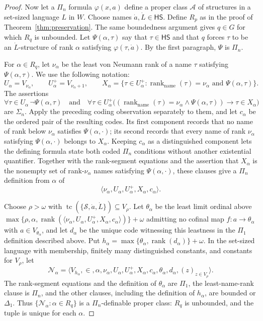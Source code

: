 \documentclass[11pt,a4paper]{amsart}
\newcommand{\HS}{\mathsf{HS}}
\newcommand{\tc}{\operatorname{tc}}
\newcommand{\rank}{\operatorname{rank}}
\newcommand{\namerank}{\operatorname{rank}_{\mathrm{name}}}
\theoremstyle{plain}
\theoremstyle{definition}
\theoremstyle{remark}
\begin{document}
\begin{proof}
Now let a $\Pi_n$ formula $\varphi(x,a)$ define a proper class $\mathcal A$ of structures in a set-sized language $L$ in $W$.  Choose names $\dot a,\dot L\in\HS$.  Define $R_p$ as in the proof of Theorem~\ref{thm:preservation}.  The same boundedness argument gives $q\in G$ for which $R_q$ is unbounded.  Let $\Psi(\alpha,\tau)$ say that $\tau\in\HS$ and that $q$ forces $\tau$ to be an $\dot L$-structure of rank $\alpha$ satisfying $\varphi(\tau,\dot a)$.  By the first paragraph, $\Psi$ is $\Pi_n$.

For $\alpha\in R_q$, let $\nu_\alpha$ be the least von Neumann rank of a name $\tau$ satisfying $\Psi(\alpha,\tau)$.  We use the following notation:
\[
U_\alpha=V_{\nu_\alpha},\qquad U_\alpha^+=V_{\nu_\alpha+1},\qquad
X_\alpha=\{\tau\in U_\alpha^+:\namerank(\tau)=\nu_\alpha\text{ and }\Psi(\alpha,\tau)\}.
\]
The assertions
\[
\forall\tau\in U_\alpha\,\neg\Psi(\alpha,\tau)
\quad\text{and}\quad
\forall\tau\in U_\alpha^+\bigl((\namerank(\tau)=\nu_\alpha\wedge\Psi(\alpha,\tau))\longrightarrow\tau\in X_\alpha\bigr)
\]
are $\Sigma_n$.  Apply the preceding coding observation separately to them, and let $c_\alpha$ be the ordered pair of the resulting codes.  Its first component records that no name of rank below $\nu_\alpha$ satisfies $\Psi(\alpha,\cdot)$; its second records that every name of rank $\nu_\alpha$ satisfying $\Psi(\alpha,\cdot)$ belongs to $X_\alpha$.  Keeping $c_\alpha$ as a distinguished component lets the defining formula state both coded $\Pi_n$ conditions without another existential quantifier.  Together with the rank-segment equations and the assertion that $X_\alpha$ is the nonempty set of rank-$\nu_\alpha$ names satisfying $\Psi(\alpha,\cdot)$, these clauses give a $\Pi_n$ definition from $\alpha$ of
\[
\langle\nu_\alpha,U_\alpha,U_\alpha^+,X_\alpha,c_\alpha\rangle.
\]

Choose $\rho>\omega$ with $\tc(\{\mathscr S,\dot a,\dot L\})\subseteq V_\rho$.  Let $\theta_\alpha$ be the least limit ordinal above $\max\{\rho,\allowbreak\alpha,\allowbreak\rank(\langle\nu_\alpha,\allowbreak U_\alpha,\allowbreak U_\alpha^+,\allowbreak X_\alpha,\allowbreak c_\alpha\rangle)\}+\omega$ admitting no cofinal map $f:a\to\theta_\alpha$ with $a\in V_{\theta_\alpha}$, and let $d_\alpha$ be the unique code witnessing this leastness in the $\Pi_1$ definition described above.  Put $h_\alpha=\max\{\theta_\alpha,\rank(d_\alpha)\}+\omega$.  In the set-sized language with membership, finitely many distinguished constants, and constants for $V_\rho$, let
\[
\mathcal N_\alpha=\bigl\langle V_{h_\alpha},\in,
\alpha,\nu_\alpha,U_\alpha,U_\alpha^+,X_\alpha,c_\alpha,
\theta_\alpha,d_\alpha,(z)_{z\in V_\rho}\bigr\rangle.
\]
The rank-segment equations and the definition of $\theta_\alpha$ are $\Pi_1$, the least-name-rank clause is $\Pi_n$, and the other clauses, including the definition of $h_\alpha$, are bounded or $\Delta_1$.  Thus $\{\mathcal N_\alpha:\alpha\in R_q\}$ is a $\Pi_n$-definable proper class: $R_q$ is unbounded, and the tuple is unique for each $\alpha$.


\end{proof}
\end{document}
